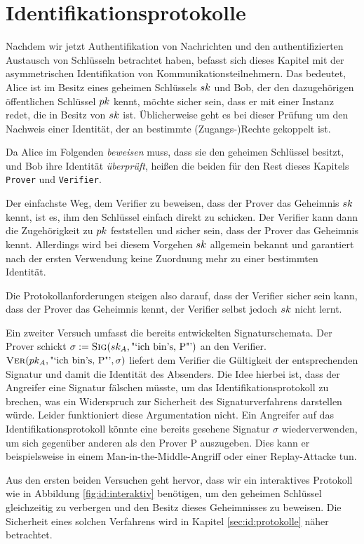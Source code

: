 \chapter{Identifikationsprotokolle} Nachdem wir jetzt Authentifikation
von Nachrichten und den authentifizierten Austausch von Schlüsseln
betrachtet haben, befasst sich dieses Kapitel mit der asymmetrischen
Identifikation von Kommunikationsteilnehmern. Das bedeutet, Alice ist im
Besitz eines geheimen Schlüssels $sk$ und Bob, der den dazugehörigen
öffentlichen Schlüssel $pk$ kennt, möchte sicher sein, dass er mit
einer Instanz redet, die in Besitz von $sk$ ist. Üblicherweise geht
es bei dieser Prüfung um den Nachweis einer Identität, der an bestimmte
(Zugangs-)Rechte gekoppelt ist.

Da Alice im Folgenden \emph{beweisen} muss, dass sie den geheimen
Schlüssel besitzt, und Bob ihre Identität \emph{überprüft}, heißen die
beiden für den Rest dieses Kapitels \texttt{Prover} und
\texttt{Verifier}.

Der einfachste Weg, dem Verifier zu beweisen, dass der Prover das
Geheimnis $sk$ kennt, ist es, ihm den Schlüssel einfach direkt zu
schicken. Der Verifier kann dann die Zugehörigkeit zu $pk$
feststellen und sicher sein, dass der Prover das Geheimnis
kennt. Allerdings wird bei diesem Vorgehen $sk$ allgemein bekannt und
garantiert nach der ersten Verwendung keine Zuordnung mehr zu einer
bestimmten Identität.

Die Protokollanforderungen steigen also darauf, dass der Verifier sicher
sein kann, dass der Prover das Geheimnis kennt, der Verifier selbst
jedoch $sk$ nicht lernt.

Ein zweiter Versuch umfasst die bereits entwickelten
Signaturschemata. Der Prover schickt $\sigma := \textsc{Sig}(sk_A,
\text{"`ich bin's, P"'})$ an den Verifier.  $\textsc{Ver}(pk_A,\text{"`ich
bin's, P"'}, \sigma)$ liefert dem Verifier die Gültigkeit der
entsprechenden Signatur und damit die Identität des Absenders. Die Idee
hierbei ist, dass der Angreifer eine Signatur fälschen müsste, um das
Identifikationsprotokoll zu brechen, was ein Widerspruch zur Sicherheit
des Signaturverfahrens darstellen würde. Leider funktioniert diese
Argumentation nicht. Ein Angreifer auf das Identifikationsprotokoll
könnte eine bereits gesehene Signatur $\sigma$ wiederverwenden, um sich
gegenüber anderen als den Prover P auszugeben. Dies kann er
beispielsweise in einem Man-in-the-Middle-Angriff oder einer
Replay-Attacke tun.

Aus den ersten beiden Versuchen geht hervor, dass wir ein interaktives
Protokoll wie in Abbildung \ref{fig:id:interaktiv} benötigen, um den
geheimen Schlüssel gleichzeitig zu verbergen und den Besitz dieses
Geheimnisses zu beweisen. Die Sicherheit eines solchen Verfahrens wird
in Kapitel \ref{sec:id:protokolle} näher betrachtet.

